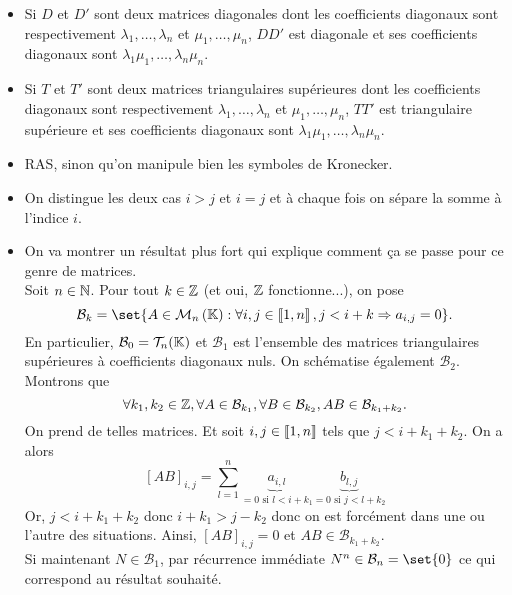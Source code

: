 \documentclass{magnolia}
\begin{document}
\begin{proposition}[utile=-3]
  $\quad$
  \begin{itemize}
  \item Si $D$ et $D'$ sont deux matrices diagonales dont les
    coefficients diagonaux sont respectivement $\lambda_1,\ldots,\lambda_n$ et
    $\mu_1,\ldots,\mu_n$, $D D'$ est diagonale et ses
    coefficients diagonaux sont $\lambda_1 \mu_1,\ldots,\lambda_n \mu_n$.
  \item Si $T$ et $T'$ sont deux matrices triangulaires supérieures dont les
    coefficients diagonaux sont respectivement $\lambda_1,\ldots,\lambda_n$ et
    $\mu_1,\ldots,\mu_n$, $T T'$ est triangulaire supérieure et ses
    coefficients diagonaux sont $\lambda_1 \mu_1,\ldots,\lambda_n \mu_n$.
  \end{itemize}
  \end{proposition}
  
  \begin{preuve}
  \begin{itemize}
  \item RAS, sinon qu'on manipule bien les symboles de Kronecker.
  \item On distingue les deux cas $i>j$ et $i=j$ et à chaque fois on sépare la somme à l'indice $i$.
  \item On va montrer un résultat plus fort qui explique comment ça se passe pour ce genre de matrices. \\
  Soit $n\in \mathbb{N}$. Pour tout $k\in \mathbb{Z}$ (et oui, $\mathbb{Z}$ fonctionne...), on pose
  $$\mathcal{B}_k=\set{A\in \mat{n}{\K} : \forall i,j \in \intere{1}{n}, j<i+k\Rightarrow a_{i,j}=0}.$$
  En particulier, $\mathcal{B}_0=\mathcal{T}_n(\mathbb{K})$ et $\mathcal{B}_1$ est l'ensemble des matrices triangulaires supérieures à coefficients diagonaux nuls. On schématise également $\mathcal{B}_2$. Montrons que $$\forall k_1,k_2\in \mathbb{Z}, \forall A\in \mathcal{B}_{k_1}, \forall B \in \mathcal{B}_{k_2}, AB \in \mathcal{B}_{k_1+k_2}.$$
  On prend de telles matrices. Et soit $i,j\in \left\llbracket 1,n\right\rrbracket$ tels que $j<i+k_1+k_2$. On a alors $$\left[AB\right]_{i,j}=\sum_{l=1}^n\underbrace{a_{i,l}}_{=0 \text{ si } l<i+k_1}\underbrace{b_{l,j}}_{=0 \text{ si } j<l+k_2}$$
  Or, $j<i+k_1+k_2$ donc $i+k_1>j-k_2$ donc on est forcément dans une ou l'autre des situations. Ainsi, $\left[AB\right]_{i,j}=0$ et $AB\in \mathcal{B}_{k_1+k_2}$.\\
  Si maintenant $N\in \mathcal{B}_1$, par récurrence immédiate $N^n\in \mathcal{B}_n=\set{0}$ ce qui correspond au résultat souhaité.
  \end{itemize}
  \end{preuve}
\end{document}
